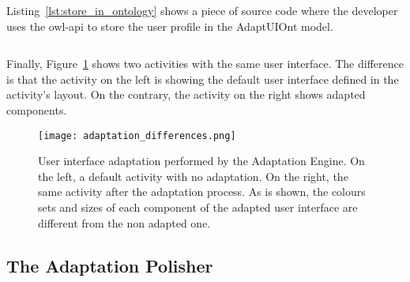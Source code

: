 \inputminted[linenos=true, fontsize=\footnotesize, frame=lines]{java}{4_system_architecture/redraw.java}


Listing~\ref{lst:store_in_ontology} shows a piece of source code where the developer
uses the \ac{owl}-\ac{api} to store the user profile in the AdaptUIOnt model. 

\inputminted[linenos=true, fontsize=\footnotesize, frame=lines]{java}{4_system_architecture/store_in_ontology.java}


Finally, Figure~\ref{fig:adaptation_differences} shows two activities with the
same user interface. The difference is that the activity on the left is showing
the default user interface defined in the activity's layout. On the contrary,
the activity on the right shows adapted components.

\begin{figure}[H]
\centering
\texttt{[image: adaptation\_differences.png]}
\caption{User interface adaptation performed by the Adaptation Engine. On the
left, a default activity with no adaptation. On the right, the same activity
after the adaptation process. As is shown, the colours sets and sizes of each
component of the adapted user interface are different from the non adapted one.}
\label{fig:adaptation_differences}
\end{figure}


\subsection{The Adaptation Polisher}
\label{sec:adaptation_polisher}

